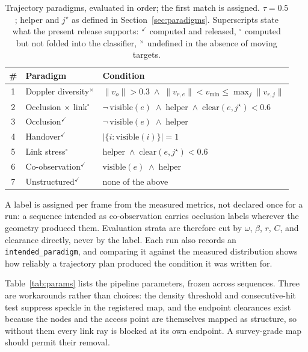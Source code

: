 \begin{table}[t]
\centering
\caption{Trajectory paradigms, evaluated in order; the first match is assigned.
$\tau = 0.5$; helper and $j^\star$ as defined in Section~\ref{sec:paradigms}.
Superscripts state what the present release supports: $^{\checkmark}$ computed
and released, $^{\circ}$ computed but not folded into the classifier,
$^{\times}$ undefined in the absence of moving targets.}
\label{tab:paradigms}
\footnotesize
\setlength{\tabcolsep}{4pt}
\begin{tabular}{@{}cll@{}}
\toprule
\# & Paradigm & Condition \\
\midrule
1 & Doppler diversity$^{\times}$      & $\lVert v_o\rVert > 0.3 \;\wedge\; \lVert v_{r,e}\rVert < v_{\min} \le \max_j \lVert v_{r,j}\rVert$ \\
2 & Occlusion $\times$ link$^{\circ}$ & $\neg\,\mathrm{visible}(e) \;\wedge\; \text{helper} \;\wedge\; \mathrm{clear}(e,j^\star) < 0.6$ \\
3 & Occlusion$^{\checkmark}$          & $\neg\,\mathrm{visible}(e) \;\wedge\; \text{helper}$ \\
4 & Handover$^{\checkmark}$           & $\lvert \{ i : \mathrm{visible}(i) \} \rvert = 1$ \\
5 & Link stress$^{\circ}$             & $\text{helper} \;\wedge\; \mathrm{clear}(e,j^\star) < 0.6$ \\
6 & Co-observation$^{\checkmark}$     & $\mathrm{visible}(e) \;\wedge\; \text{helper}$ \\
7 & Unstructured$^{\checkmark}$       & none of the above \\
\bottomrule
\end{tabular}
\end{table}

A label is assigned per frame from the measured metrics, not declared once for a
run: a sequence intended as co-observation carries occlusion labels wherever the
geometry produced them. Evaluation strata are therefore cut by $\omega$,
$\beta$, $r$, $C$, and clearance directly, never by the label. Each run also
records an \texttt{intended\_paradigm}, and comparing it against the measured
distribution shows how reliably a trajectory plan produced the condition it was
written for.

Table~\ref{tab:params} lists the pipeline parameters, frozen across sequences.
Three are workarounds rather than choices: the density threshold and
consecutive-hit test suppress speckle in the registered map, and the endpoint
clearances exist because the nodes and the access point are themselves mapped as
structure, so without them every link ray is blocked at its own endpoint. A
survey-grade map should permit their removal.

